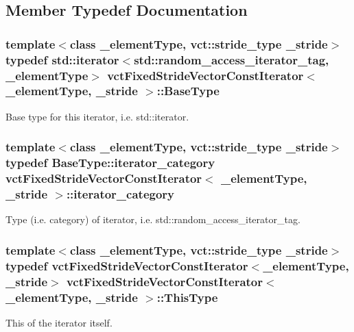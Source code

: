 \subsection{Member Typedef Documentation}
\hypertarget{classvct_fixed_stride_vector_const_iterator_ad92100e30e7cbc86c778a0a01a1d19e5}{
\subsubsection[{Base\-Type}]{\setlength{\rightskip}{0pt plus 5cm}template$<$class \-\_\-element\-Type, vct\-::stride\-\_\-type \-\_\-stride$>$ typedef std\-::iterator$<$std\-::random\-\_\-access\-\_\-iterator\-\_\-tag, \-\_\-element\-Type$>$ {\bf vct\-Fixed\-Stride\-Vector\-Const\-Iterator}$<$ \-\_\-element\-Type, \-\_\-stride $>$\-::{\bf Base\-Type}}}\label{classvct_fixed_stride_vector_const_iterator_ad92100e30e7cbc86c778a0a01a1d19e5}
Base type for this iterator, i.\-e. std\-::iterator. \hypertarget{classvct_fixed_stride_vector_const_iterator_adda9caa49222d747d94b783c74fb95eb}{
\subsubsection[{iterator\-\_\-category}]{\setlength{\rightskip}{0pt plus 5cm}template$<$class \-\_\-element\-Type, vct\-::stride\-\_\-type \-\_\-stride$>$ typedef Base\-Type\-::iterator\-\_\-category {\bf vct\-Fixed\-Stride\-Vector\-Const\-Iterator}$<$ \-\_\-element\-Type, \-\_\-stride $>$\-::{\bf iterator\-\_\-category}}}\label{classvct_fixed_stride_vector_const_iterator_adda9caa49222d747d94b783c74fb95eb}
Type (i.\-e. category) of iterator, i.\-e. std\-::random\-\_\-access\-\_\-iterator\-\_\-tag. \hypertarget{classvct_fixed_stride_vector_const_iterator_ac60fc9d8c2af56a7f251d9a7040efa1e}{
\subsubsection[{This\-Type}]{\setlength{\rightskip}{0pt plus 5cm}template$<$class \-\_\-element\-Type, vct\-::stride\-\_\-type \-\_\-stride$>$ typedef {\bf vct\-Fixed\-Stride\-Vector\-Const\-Iterator}$<$\-\_\-element\-Type, \-\_\-stride$>$ {\bf vct\-Fixed\-Stride\-Vector\-Const\-Iterator}$<$ \-\_\-element\-Type, \-\_\-stride $>$\-::{\bf This\-Type}}}\label{classvct_fixed_stride_vector_const_iterator_ac60fc9d8c2af56a7f251d9a7040efa1e}
This of the iterator itself. 


